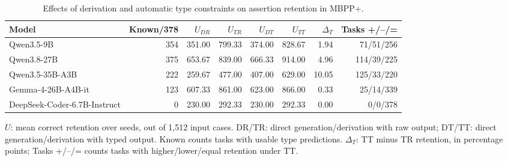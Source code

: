 \begin{table}[t]
\centering
\small
\caption{Effects of derivation and automatic type constraints on assertion retention in MBPP+.}
\label{tab:types_full}
\begin{tabular}{lrrrrrrr}
\toprule
Model & Known/378 & $U_{DR}$ & $U_{TR}$ & $U_{DT}$ & $U_{TT}$ & $\Delta_T$ & Tasks +/--/= \\
\midrule
Qwen3.5-9B & 354 & 351.00 & 799.33 & 374.00 & 828.67 & 1.94 & 71/51/256 \\
Qwen3.8-27B & 375 & 653.67 & 839.00 & 666.33 & 914.00 & 4.96 & 114/39/225 \\
Qwen3.5-35B-A3B & 222 & 259.67 & 477.00 & 407.00 & 629.00 & 10.05 & 125/33/220 \\
Gemma-4-26B-A4B-it & 123 & 607.33 & 861.00 & 623.00 & 866.00 & 0.33 & 25/14/339 \\
DeepSeek-Coder-6.7B-Instruct & 0 & 230.00 & 292.33 & 230.00 & 292.33 & 0.00 & 0/0/378 \\
\bottomrule
\end{tabular}
\par\smallskip
\begin{minipage}{\linewidth}
\footnotesize
$U$: mean correct retention over seeds, out of 1,512 input cases. DR/TR: direct generation/derivation with raw output; DT/TT: direct generation/derivation with typed output. Known counts tasks with usable type predictions. $\Delta_T$: TT minus TR retention, in percentage points; Tasks +/--/= counts tasks with higher/lower/equal retention under TT.
\end{minipage}
\end{table}
